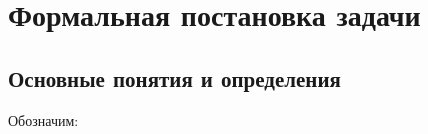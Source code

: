 \begin{comment}
\subsection{Детализация постановки}
Для решения поставленной задачи необходимо решить следующие подзадачи:
\begin{itemize}
\item Разработать и реализовать набор инструментов для установки
контрольных точек в программе, а также динамической установки таких
точек в работающей программе.
\item Выбрать пример сетевого приложения, в котором: а) есть удалённо
эксплуатируемая уязвимость, б) данная уязвимость позволяет нарушить
конфиденциальность, целостность или доступность системы в случае
компрометации даже при наличии политики SELinux (контрпример к SELinux).
Показать, как можно расставить контрольные точки в данном приложении,
чтобы ущерб от атаки был минимальным.
\item Разработать и реализовать механизм наблюдения за поведением со
стороны ядра, отладить на выбранном примере сетевого приложения.
\item Опубликовать проект в публичном репозитории и в тематических списках
рассылки.
\end{itemize}

\subsection{Ожидаемые результаты}
\begin{itemize}
\item Набор утилит для расстановки контрольных точек, с использованием
результатов работы Татьяны Горнак прошлого года.
\item Набор модулей ядра, реализующий контроль поведения и переключение
контекстов SELinux, желательно с минимальными модификациями кода ядра.
\item Публичный репозиторий со всем, что необходимо стороннему пользователю
для того, чтобы воспользоваться результатами работы.
\end{itemize}

\end{comment}
\section{Формальная постановка задачи}

\subsection{Основные понятия и определения}
Обозначим: 

